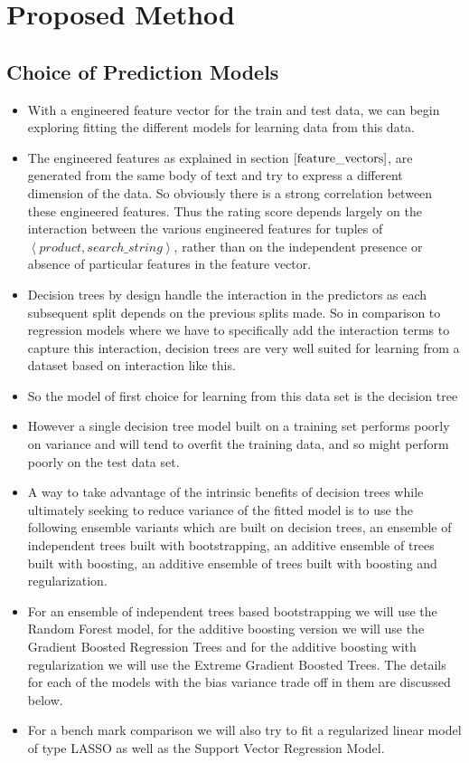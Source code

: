 \documentclass[twoside,12pt]{article}
\newcommand{\tuple}[1]{\ensuremath{\left \langle #1 \right \rangle }}
\begin{document}
\section{Proposed Method}
\label{proposed_method}

\subsection{Choice of Prediction Models}
\label{predicton_model}
\begin{itemize}
	\item 
	With a engineered feature vector for the train and test data, we can begin exploring fitting the different models for learning data from this data.
	\item
	The engineered features as explained in section $\eqref{feature_vectors}$, are generated from the same body of text and try to express a different dimension of the data. So obviously there is a strong correlation between these engineered features. Thus the rating score depends largely on the interaction between the various engineered features for tuples of \tuple{product,search\_string}, rather than on the independent presence or absence of particular features in the feature vector.
	\item
	Decision trees by design handle the interaction in the predictors as each subsequent split depends on the previous splits made. So in comparison to regression models where we have to specifically add the interaction terms to capture this interaction,  decision trees are very well suited for learning from a dataset based on interaction like this.
	\item
	So the model of first choice for learning from this data set is the decision tree
	\item
	However a single decision tree model built on a training set performs poorly on variance and will tend to overfit the training data, and so might perform poorly on the test data set.
	\item
	A way to take advantage of the intrinsic benefits of decision trees while ultimately seeking to reduce variance of the fitted model is to use the following ensemble variants which are built on decision trees, an ensemble of independent trees built with bootstrapping, an additive ensemble of trees built with boosting, an additive ensemble of trees built with boosting and regularization. 
	\item
	For an ensemble of independent trees based bootstrapping we will use the Random Forest model, for the additive boosting version we will use the Gradient Boosted Regression Trees and for the additive boosting with regularization we will use the Extreme Gradient Boosted Trees. The details for each of the models with the bias variance trade off in them are discussed below.
	\item
	For a bench mark comparison we will also try to fit a regularized linear model of type LASSO as well as the Support Vector Regression Model.
\end{itemize}
\end{document}
